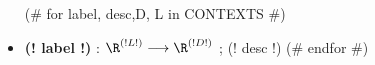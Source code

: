 \begin{itemize}
    (# for label, desc,D, L in CONTEXTS #)
    \item  \textbf{(! label !)} :  $\R^{(! L !)} \longrightarrow \R^{(! D !)}$ ; (! desc !)
    (# endfor #)
\end{itemize}